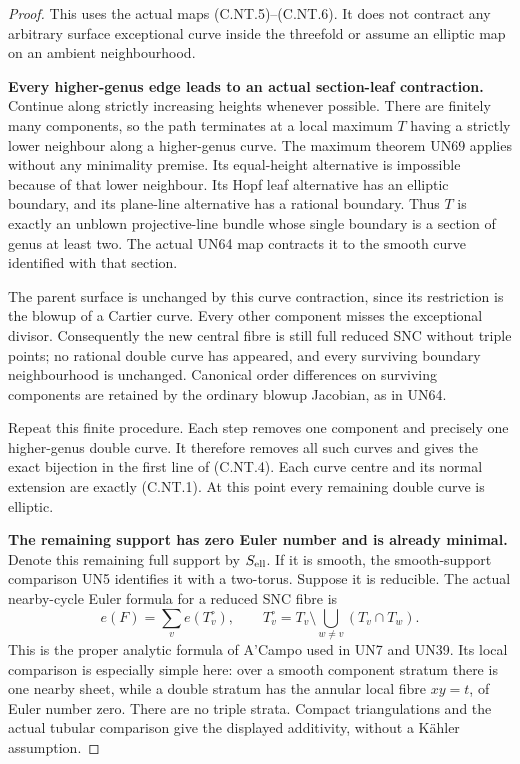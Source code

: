 \begin{proof}
This uses the actual maps (C.NT.5)--(C.NT.6). It does
not contract any arbitrary surface exceptional curve
inside the threefold or assume an elliptic map on an
ambient neighbourhood.

\par\medskip\noindent\textbf{Every higher-genus edge leads to an actual section-leaf contraction.}
Continue along strictly increasing heights whenever
possible. There are finitely many components, so the
path terminates at a local maximum $T$ having a
strictly lower neighbour along a higher-genus curve.
The maximum theorem UN69 applies without any
minimality premise. Its equal-height alternative is
impossible because of that lower neighbour. Its Hopf
leaf alternative has an elliptic boundary, and its
plane-line alternative has a rational boundary.
Thus $T$ is exactly an unblown projective-line
bundle whose single boundary is a section of genus
at least two. The actual UN64 map contracts it
to the smooth curve identified with that section.

The parent surface is unchanged by this curve
contraction, since its restriction is the blowup
of a Cartier curve. Every other component misses
the exceptional divisor. Consequently the new
central fibre is still full reduced SNC without
triple points; no rational double curve has appeared,
and every surviving boundary neighbourhood is
unchanged. Canonical order differences on surviving
components are retained by the ordinary blowup
Jacobian, as in UN64.

Repeat this finite procedure. Each step removes
one component and precisely one higher-genus double
curve. It therefore removes all such curves and
gives the exact bijection in the first line of
(C.NT.4). Each curve centre and its normal extension
are exactly (C.NT.1). At this point every remaining
double curve is elliptic.

\par\medskip\noindent\textbf{The remaining support has zero Euler number and is already minimal.}
Denote this remaining full support by $S_{\rm ell}$.
If it is smooth, the smooth-support comparison UN5
identifies it with a two-torus. Suppose it is
reducible. The actual nearby-cycle Euler formula
for a reduced SNC fibre is
\[
        e(F)=\sum_v e(T_v^\circ),\qquad
        T_v^\circ=T_v\setminus
                          \bigcup_{w\ne v}(T_v\cap T_w).
\tag{C.NT.7}
\]
This is the proper analytic formula of A'Campo used
in UN7 and UN39. Its local comparison is especially
simple here: over a smooth component stratum there
is one nearby sheet, while a double stratum has
the annular local fibre $xy=t$, of Euler number zero.
There are no triple strata. Compact triangulations
and the actual tubular comparison give the displayed
additivity, without a Kähler assumption.


\end{proof}
